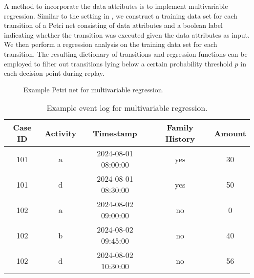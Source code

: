 A method to incorporate the data attributes is to implement multivariable regression. Similar to the setting in \cite{sldpn}, we construct a training data set for each transition of a Petri net consisting of data attributes and a boolean label indicating whether the transition was executed given the data attributes as input. We then perform a regression analysis on the training data set for each transition. The resulting dictionary of transitions and regression functions can be employed to filter out transitions lying below a certain probability threshold $p$ in each decision point during replay.

\begin{figure}
    \centering
    \caption{Example Petri net for multivariable regression.}
    \label{fig:model-multivar-regression}
\end{figure}


\begin{table}[h!]
    \centering
    \caption{Example event log for multivariable regression.}
    \begin{tabular}{|c|c|c|c|c|}
    \hline
    Case ID & Activity & Timestamp & Family History & Amount \\
    \hline
    101 & a & 2024-08-01 08:00:00 & yes & 30 \\
    101 & d & 2024-08-01 08:30:00 & yes & 50 \\
    102 & a & 2024-08-02 09:00:00 & no & 0 \\
    102 & b & 2024-08-02 09:45:00 & no & 40 \\
    102 & d & 2024-08-02 10:30:00 & no & 56 \\
    \hline
    \end{tabular}
    \label{tab:log-multivar-regression}
    \end{table}
